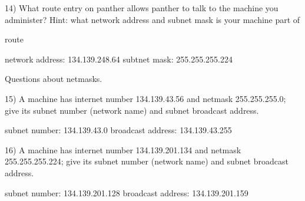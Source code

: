 14) What route entry on {\ltt{}panther} allows {\ltt{}panther}
to talk to the machine you administer?
Hint: what network address and subnet mask is your machine part of

route

network address: 134.139.248.64
subtnet mask: 255.255.255.224


Questions about netmasks.

15) A machine has internet number {\ltt{} 134.139.43.56}
and netmask {\ltt{} 255.255.255.0};
give its subnet number (network name) and subnet broadcast address.

subnet number: 134.139.43.0
broadcast address: 134.139.43.255


16) A machine has internet number {\ltt{} 134.139.201.134}
and netmask {\ltt{} 255.255.255.224};
give its subnet number (network name) and subnet broadcast address.

subnet number: 134.139.201.128
broadcast address: 134.139.201.159

\bye

